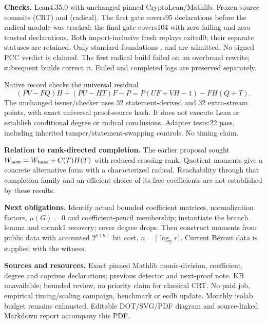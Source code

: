 \documentclass[11pt]{article}
\begin{document}
\textbf{Checks.} Lean4.35.0 with unchanged pinned CryptoLean/Mathlib.
Frozen source commits  (CRT) and  (radical).
The first gate covers95 declarations before the radical module was tracked;
the final gate covers104 with zero failing and zero trusted declarations.
Both import-inclusive fresh replays exited0; their separate statuses are retained.
Only standard foundations ,  and
 are admitted. No signed PCC verdict is claimed.
The first radical build failed on an overbroad rewrite; subsequent builds
correct it. Failed and completed logs are preserved separately.

Native record  checks the universal residual
\[
 (PV-FQ)H+(PU-HT)F-P=P(UF+VH-1)-FH(Q+T).
\]
The unchanged issuer/checker uses 32 statement-derived and 32 extra-stream
points, with exact universal proof-source hash. It does not execute Lean or
establish conditional degree or radical conclusions. Adapter tests:22 pass,
including inherited tamper/statement-swapping controls. No timing claim.

\textbf{Relation to rank-directed completion.} The earlier proposal sought
$W_{\rm new}=W_{\rm base}+C(T)H(T)$ with reduced crossing rank. Quotient
moments give a concrete alternative form with a characterized radical.
Reachability through that completion family and an efficient choice of its
free coefficients are not established by these results.

\textbf{Next obligations.} Identify actual bounded coefficient matrices,
normalization factors, $\mu(G)=0$ and coefficient-pencil membership; instantiate
the branch lemma and corank1 recovery; cover degree drops. Then construct
moments from public data with accounted $2^{o(n)}$ bit cost,
$n=\lceil\log_2r\rceil$. Current B\'ezout data is supplied with the witness.

\textbf{Sources and resources.} Exact pinned Mathlib monic-division,
coefficient, degree and coprime declarations; previous detector and next-proof
note. KB unavailable; bounded review, no priority claim for classical CRT.
No paid job, empirical timing/scaling campaign, benchmark or ecdb update.
Monthly isolab budget remains exhausted. Editable DOT/SVG/PDF diagram and
source-linked Markdown report accompany this PDF.
\end{document}
